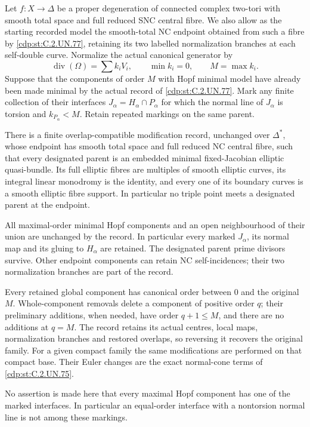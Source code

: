 
\begin{proposition}\label{cdp:st:C.2.UN.81}
Let \(f:X\to\Delta\) be a proper degeneration of connected
complex two-tori with smooth total space and full reduced
SNC central fibre. We also allow as the starting recorded model
the smooth-total NC endpoint obtained from such a fibre by
\ref{cdp:st:C.2.UN.77}, retaining its two labelled normalization branches at
each self-double curve. Normalize the actual canonical generator by
\[
 \operatorname{div}(\Omega)=\sum k_iV_i,\qquad
 \min k_i=0,\qquad M=\max k_i.
 \tag{C.AP.1}\label{cdp:eq:C.AP.1}
\]
Suppose that the components of order \(M\) with Hopf minimal
model have already been made minimal by the actual record of
\ref{cdp:st:C.2.UN.77}. Mark any finite collection of their interfaces
\(J_\alpha=H_\alpha\cap P_\alpha\) for which the normal line of
\(J_\alpha\) is torsion and \(k_{P_\alpha}<M\).
Retain repeated markings on the same parent.

There is a finite overlap-compatible modification record,
unchanged over \(\Delta^*\), whose endpoint has smooth total
space and full reduced NC central fibre, such that every
designated parent is an embedded minimal fixed-Jacobian
elliptic quasi-bundle. Its full elliptic fibres are multiples
of smooth elliptic curves, its integral linear monodromy is
the identity, and every one of its boundary curves is a
smooth elliptic fibre support. In particular no triple point
meets a designated parent at the endpoint.

All maximal-order minimal Hopf components and an open
neighbourhood of their union are unchanged by the record.
In particular every marked \(J_\alpha\), its normal map and
its gluing to \(H_\alpha\) are retained. The designated parent
prime divisors survive. Other endpoint components can retain
NC self-incidences; their two normalization branches are
part of the record.

Every retained global component has canonical order between
\(0\) and the original \(M\). Whole-component removals delete
a component of positive order \(q\); their preliminary
additions, when needed, have order \(q+1\le M\), and there
are no additions at \(q=M\). The record retains its actual
centres, local maps, normalization branches and restored
overlaps, so reversing it recovers the original family.
For a given compact family the same modifications are
performed on that compact base. Their Euler changes are
the exact normal-cone terms of \ref{cdp:st:C.2.UN.75}.

No assertion is made here that every maximal Hopf component
has one of the marked interfaces. In particular an
equal-order interface with a nontorsion normal line is not
among these markings.
\end{proposition}


